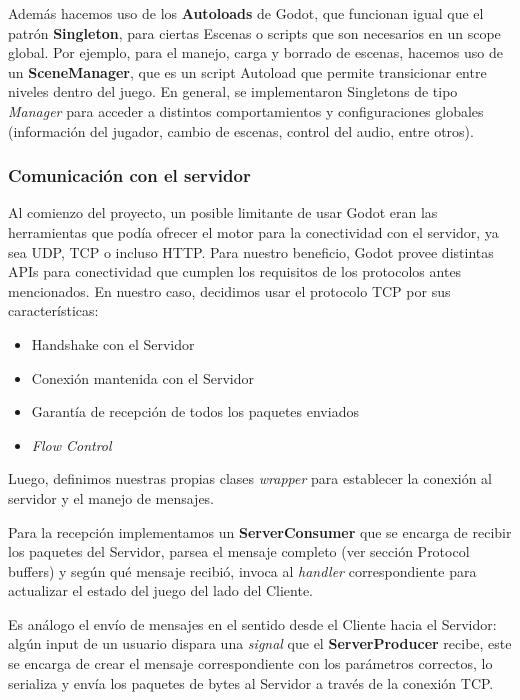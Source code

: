 Además hacemos uso de los \textbf{Autoloads} de Godot, que funcionan igual que el patrón \textbf{Singleton}, 
para ciertas Escenas o scripts que son necesarios en un scope global. Por ejemplo, para el manejo, carga 
y borrado de escenas, hacemos uso de un \textbf{SceneManager}, que es un script Autoload que permite 
transicionar entre niveles dentro del juego. En general, se implementaron Singletons de tipo \textit{Manager}
para acceder a distintos comportamientos y configuraciones globales (información del jugador, cambio de 
escenas, control del audio, entre otros).

\subsubsection{Comunicación con el servidor}

Al comienzo del proyecto, un posible limitante de usar Godot eran las herramientas que podía ofrecer 
el motor para la conectividad con el servidor, ya sea UDP, TCP o incluso HTTP. 
Para nuestro beneficio, Godot provee distintas APIs para conectividad que cumplen los requisitos
de los protocolos antes mencionados. En nuestro caso, decidimos usar el protocolo TCP por sus características:
\begin{itemize}
    \item Handshake con el Servidor
    \item Conexión mantenida con el Servidor
    \item Garantía de recepción de todos los paquetes enviados
    \item \textit{Flow Control}
\end{itemize}

Luego, definimos nuestras propias clases \textit{wrapper} para establecer la conexión al servidor y el 
manejo de mensajes. 

Para la recepción implementamos un \textbf{ServerConsumer} que se encarga de recibir los paquetes 
del Servidor, parsea el mensaje completo (ver sección Protocol buffers) y según qué mensaje recibió, 
invoca al \textit{handler} correspondiente para actualizar el estado del juego del lado del Cliente.

Es análogo el envío de mensajes en el sentido desde el Cliente hacia el Servidor: algún input de un 
usuario dispara una \textit{signal} que el \textbf{ServerProducer} recibe, este se encarga de crear 
el mensaje correspondiente con los parámetros correctos, lo serializa y envía los paquetes de bytes 
al Servidor a través de la conexión TCP.

